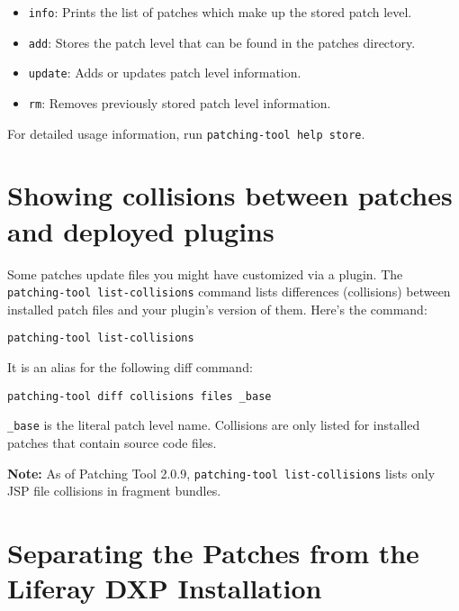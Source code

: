 \begin{itemize}
\tightlist
\item
  \texttt{info}: Prints the list of patches which make up the stored
  patch level.
\item
  \texttt{add}: Stores the patch level that can be found in the patches
  directory.
\item
  \texttt{update}: Adds or updates patch level information.
\item
  \texttt{rm}: Removes previously stored patch level information.
\end{itemize}

For detailed usage information, run \texttt{patching-tool\ help\ store}.

\section{Showing collisions between patches and deployed
plugins}\label{showing-collisions-between-patches-and-deployed-plugins}

Some patches update files you might have customized via a plugin. The
\texttt{patching-tool\ list-collisions} command lists differences
(collisions) between installed patch files and your plugin's version of
them. Here's the command:

\begin{verbatim}
patching-tool list-collisions
\end{verbatim}

It is an alias for the following diff command:

\begin{verbatim}
patching-tool diff collisions files _base
\end{verbatim}

\texttt{\_base} is the literal patch level name. Collisions are only
listed for installed patches that contain source code files.

\noindent\hrulefill

\textbf{Note:} As of Patching Tool 2.0.9,
\texttt{patching-tool\ list-collisions} lists only JSP file collisions
in fragment bundles.

\noindent\hrulefill

\section{Separating the Patches from the Liferay DXP
Installation}\label{separating-the-patches-from-the-liferay-dxp-installation}

